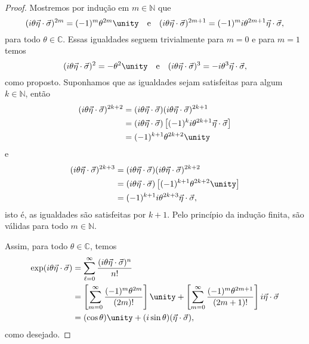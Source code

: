 \begin{proof}
    Mostremos por indução em \(m \in \mathbb{N}\) que
    \begin{equation*}
        (i\theta\vec \eta \cdot \vec \sigma)^{2m} = (-1)^m\theta^{2m}\unity\quad\text{e}\quad(i\theta\vec \eta \cdot \vec \sigma)^{2m+1} = (-1)^{m}i\theta^{2m+1}\vec \eta \cdot \vec \sigma,
    \end{equation*}
    para todo \(\theta \in \mathbb{C}\). Essas igualdades seguem trivialmente para \(m = 0\) e para \(m = 1\) temos
    \begin{equation*}
        (i\theta \vec \eta\cdot \vec \sigma)^2 = - \theta^2 \unity\quad\text{e}\quad(i\theta\vec\eta\cdot\vec\sigma)^3 = -i\theta^3 \vec \eta \cdot \vec \sigma,
    \end{equation*}
    como proposto. Suponhamos que as igualdades sejam satisfeitas para algum \(k \in \mathbb{N}\), então
    \begin{align*}
        (i\theta\vec \eta \cdot \vec \sigma)^{2k+2} &= (i\theta\vec \eta \cdot \vec \sigma)(i\theta\vec \eta \cdot \vec \sigma)^{2k+1}\\
                                                    &= (i\theta\vec \eta \cdot \vec \sigma)\left[(-1)^ki\theta^{2k+1}\vec \eta\cdot \vec \sigma\right]\\
                                                    &= (-1)^{k+1}\theta^{2k+2} \unity
    \end{align*}
    e
    \begin{align*}
        (i\theta\vec \eta \cdot \vec \sigma)^{2k+3} &= (i\theta\vec \eta \cdot \vec \sigma)(i\theta\vec \eta \cdot \vec \sigma)^{2k+2}\\
                                                    &= (i\theta\vec \eta \cdot \vec \sigma)\left[(-1)^{k+1}\theta^{2k+2} \unity\right]\\
                                                    &= (-1)^{k+1}i\theta^{2k+3}\vec \eta \cdot \vec \sigma,
    \end{align*}
    isto é, as igualdades são satisfeitas por \(k + 1\). Pelo princípio da indução finita, são válidas para todo \(m \in \mathbb{N}\).

    Assim, para todo \(\theta \in \mathbb{C}\), temos
    \begin{align*}
        \exp(i\theta \vec \eta \cdot \vec \sigma) &= \sum_{\ell = 0}^{\infty} \frac{(i \theta \vec \eta \cdot \vec \sigma)^n}{n!}\\
                                                  &= \left[\sum_{m = 0}^{\infty} \frac{(-1)^{m}\theta^{2m}}{(2m)!}\right] \unity + \left[\sum_{m=0}^\infty\frac{(-1)^m \theta^{2m+1}}{(2m+1)!}\right] i \vec \eta \cdot \vec \sigma\\
                                                  &= (\cos\theta)\unity + (i\sin\theta)(\vec \eta \cdot \vec \sigma),
    \end{align*}
    como desejado.
\end{proof}
